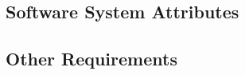 \documentclass{article}
\begin{document}
	\subsection{Software System Attributes}
	\subsection{Other Requirements}
\end{document}
